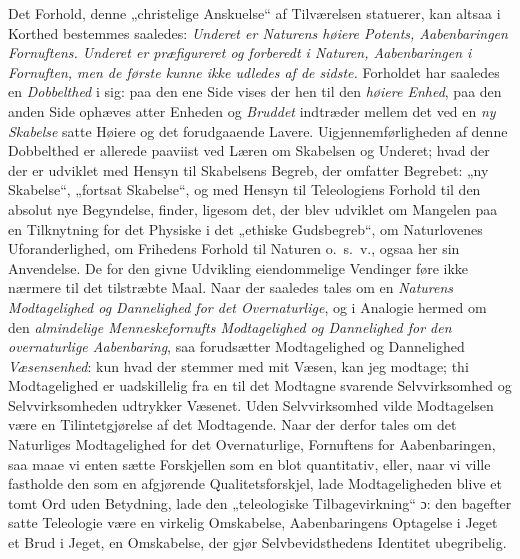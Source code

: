 \documentclass[12pt,a4paper]{book}
\newcommand{\opage}[1]{\marginnote{\footnotesize\textit{[#1]}}}
\begin{document}
Det Forhold, denne „christelige Anskuelse“ af Tilværelsen statuerer, kan altsaa i Korthed
bestemmes saaledes: \emph{Underet er Naturens høiere Potents, Aabenbaringen Fornuftens.
Underet er præfigureret og forberedt i Naturen, Aabenbaringen i Fornuften, men de første
kunne ikke udledes af de sidste.} Forholdet har saaledes en \emph{Dobbelthed} i sig: paa den ene Side vises der hen til den \emph{høiere Enhed}, paa den anden Side ophæves atter Enheden og \emph{Bruddet} indtræder mellem det ved en \emph{ny Skabelse} satte Høiere og det forudgaaende Lavere. Uigjennemførligheden af denne Dobbelthed er allerede paaviist ved Læren om
Skabelsen og Underet; hvad der der er udviklet med Hensyn til Skabelsens Begreb, der
omfatter Begrebet: „ny Skabelse“, „fortsat Skabelse“, og med Hensyn til Teleologiens
Forhold til den absolut nye Begyndelse, finder, ligesom det, der blev udviklet om Mangelen
paa en Tilknytning for det Physiske i det „ethiske Gudsbegreb“, om Naturlovenes
Uforanderlighed, om Frihedens Forhold til Naturen o.\ s.\ v., ogsaa her sin Anvendelse. De
for den givne Udvikling eiendommelige Vendinger føre ikke nærmere til det tilstræbte Maal.
Naar der saaledes tales om en \emph{Naturens Modtagelighed og Dannelighed for det
Overnaturlige}, og i Analogie hermed om den \emph{almindelige Menneskefornufts
Modtagelighed og Dannelighed for \opage{92}den overnaturlige Aabenbaring}, saa forudsætter
Modtagelighed og Dannelighed \emph{Væsensenhed}: kun hvad der stemmer med mit Væsen, kan
jeg modtage; thi Modtagelighed er uadskillelig fra en til det Modtagne svarende
Selvvirksomhed og Selvvirksomheden udtrykker Væsenet. Uden Selvvirksomhed vilde
Modtagelsen være en Tilintetgjørelse af det Modtagende. Naar der derfor tales om det
Naturliges Modtagelighed for det Overnaturlige, Fornuftens for Aabenbaringen, saa maae vi
enten sætte Forskjellen som en blot quantitativ, eller, naar vi ville fastholde den som en
afgjørende Qualitetsforskjel, lade Modtageligheden blive et tomt Ord uden Betydning, lade
den „teleologiske Tilbagevirkning“ ɔ: den bagefter satte Teleologie være en virkelig
Omskabelse, Aabenbaringens Optagelse i Jeget et Brud i Jeget, en Omskabelse, der gjør
Selvbevidsthedens Identitet ubegribelig.
\end{document}
